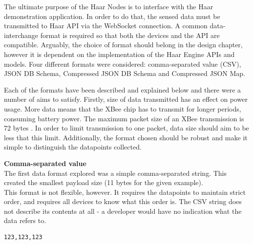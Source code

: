     The ultimate purpose of the Haar Nodes is to interface with the Haar demonstration application. In order to do that, the sensed data must be transmitted to Haar API via the WebSocket connection. A common data-interchange format is required so that both the devices and the API are compatible. Arguably, the choice of format should belong in the design chapter, however it is dependent on the implementation of the Haar Engine APIs and models. Four different formats were considered: comma-separated value (CSV), JSON DB Schema, Compressed JSON DB Schema and Compressed JSON Map.

    Each of the formats have been described and explained below and there were a number of aims to satisfy. Firstly, size of data transmitted has an effect on power usage. More data means that the XBee chip has to transmit for longer periods, consuming battery power. The maximum packet size of an XBee transmission is 72 bytes \citep{xbee-packet-size}. In order to limit transmission to one packet, data size should aim to be less that this limit. Additionally, the format chosen should be robust and make it simple to distinguish the datapoints collected.\\

    \noindent
    \begin{minipage}[t]{0.45\textwidth}
      \textbf{Comma-separated value}\\
      The first data format explored was a simple comma-separated string. This created the smallest payload size (11 bytes for the given example).\\

      This format is not flexible, however. It requires the datapoints to maintain strict order, and requires all devices to know what this order is. The CSV string does not describe its contents at all - a developer would have no indication what the data refers to.\\
    \end{minipage}
    \hfill
    \begin{minipage}[t]{0.45\textwidth}
      \begin{lstlisting}[frame=single]
123,123,123
      \end{lstlisting}
    \end{minipage}

